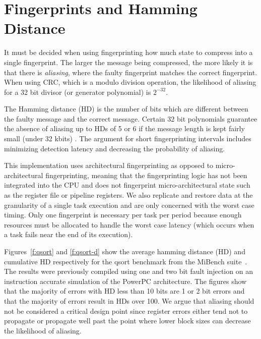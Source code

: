 \section{Fingerprints and Hamming Distance}

	It must be decided when using fingerprinting how much state to compress into a single fingerprint. The larger the message being compressed, the more likely it is that there is \emph{aliasing}, where the faulty fingerprint matches the correct fingerprint. 
	When using CRC, which is a modulo division operation, the likelihood of aliasing for a 32 bit divisor (or generator polynomial) is $2^{-32}$.
	
	The Hamming distance (HD) is the number of bits which are different between the faulty message and the correct message. 
	Certain 32 bit polynomials guarantee the absence of aliasing up to HDs of 5 or 6 if the message length is kept fairly small (under 32 kbits) \cite{koopman200232}.
	The argument for short fingerprinting intervals includes minimizing detection latency and decreasing the probability of aliasing.

	This implementation uses architectural fingerprinting as opposed to micro-architectural fingerprinting, meaning that the fingerprinting logic has not been integrated into the CPU and does not fingerprint micro-architectural state such as the register file or pipeline registers.
	We also replicate and restore data at the granularity of a single task execution and are only concerned with the worst case timing.
	Only one fingerprint is necessary per task per period because enough resources must be allocated to handle the worst case latency (which occurs when a task fails near the end of its execution). 
		
	Figures~\ref{f:qsort} and \ref{f:qsort-d} show the average hamming distance (HD) and cumulative HD respectively for the qsort benchmark from the MiBench suite~\cite{guthaus2001mibench}. 
	The results were previously compiled using one and two bit fault injection on an instruction accurate simulation of the PowerPC architecture. 
	The figures show that the majority of errors with HD less than 10 bits are 1 or 2 bit errors and that the majority of errors result in HDs over 100. 
	We argue that aliasing should not be considered a critical design point since register errors either tend not to propagate or propagate well past the point where lower block sizes can decrease the likelihood of aliasing.
	
